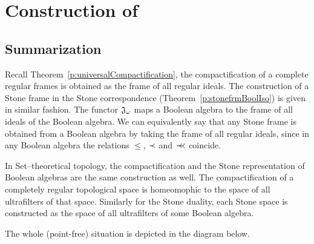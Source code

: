 \chapter{Construction of \R}

\section{Summarization}

Recall Theorem~\ref{p:universalCompactification}, the compactification of a complete regular frames is obtained as the frame of all regular ideals. The construction of a Stone frame in the Stone correspondence (Theorem~\ref{p:stonefrmBoolIso}) is given in similar fashion. The functor $\mathfrak{J}_{\omega}$ maps a Boolean algebra to the frame of all ideals of the Boolean algebra. We can equivalently say that any Stone frame is obtained from a Boolean algebra by taking the frame of all regular ideals, since in any Boolean algebra the relations $\leq$, $\prec$ and $\prec\mkern-7mu\prec$ coincide.

In Set--theoretical topology, the compactification and the Stone representation of Boolean algebras are the same construction as well.
The compactification of a completely regular topological space is homeomophic to the space of all ultrafilters of that space. Similarly for the Stone duality, each Stone space is constructed as the space of all ultrafilters of some Boolean algebra.

The whole (point-free) situation is depicted in the diagram below.



